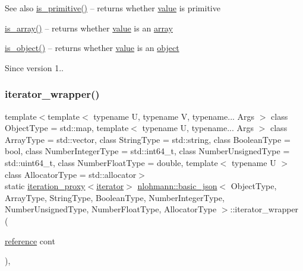 \begin{DoxySeeAlso}{See also}
\hyperlink{classnlohmann_1_1basic__json_adcd6086bac286854d5cc8b7f84d74a49}{is\+\_\+primitive()} -- returns whether \hyperlink{classnlohmann_1_1basic__json_a407e73a037e6e3067ef7aa2c25a79f39}{value} is primitive 

\hyperlink{classnlohmann_1_1basic__json_a256a4cef002023acab3c9d75b569f54a}{is\+\_\+array()} -- returns whether \hyperlink{classnlohmann_1_1basic__json_a407e73a037e6e3067ef7aa2c25a79f39}{value} is an \hyperlink{classnlohmann_1_1basic__json_a5685815624b086caa532f41e853d4b0f}{array} 

\hyperlink{classnlohmann_1_1basic__json_a94ba313c00f1713fa4be85de64083754}{is\+\_\+object()} -- returns whether \hyperlink{classnlohmann_1_1basic__json_a407e73a037e6e3067ef7aa2c25a79f39}{value} is an \hyperlink{classnlohmann_1_1basic__json_ad25b2f8c21e241e2d63455537a9294ff}{object}
\end{DoxySeeAlso}
\begin{DoxySince}{Since}
version 1.. 
\end{DoxySince}
\hypertarget{classnlohmann_1_1basic__json_ab936779c70bec68343ef440ed13251e5}{}\label{classnlohmann_1_1basic__json_ab936779c70bec68343ef440ed13251e5} 
\subsubsection{\texorpdfstring{iterator\+\_\+wrapper()}{iterator\_wrapper()}\hspace{0.1cm}{\footnotesize\ttfamily [1/2]}}
{\footnotesize\ttfamily template$<$template$<$ typename U, typename V, typename... Args $>$ class Object\+Type = std\+::map, template$<$ typename U, typename... Args $>$ class Array\+Type = std\+::vector, class String\+Type  = std\+::string, class Boolean\+Type  = bool, class Number\+Integer\+Type  = std\+::int64\+\_\+t, class Number\+Unsigned\+Type  = std\+::uint64\+\_\+t, class Number\+Float\+Type  = double, template$<$ typename U $>$ class Allocator\+Type = std\+::allocator$>$ \\
static \hyperlink{classnlohmann_1_1basic__json_1_1iteration__proxy}{iteration\+\_\+proxy}$<$\hyperlink{classnlohmann_1_1basic__json_1_1iterator}{iterator}$>$ \hyperlink{classnlohmann_1_1basic__json}{nlohmann\+::basic\+\_\+json}$<$ Object\+Type, Array\+Type, String\+Type, Boolean\+Type, Number\+Integer\+Type, Number\+Unsigned\+Type, Number\+Float\+Type, Allocator\+Type $>$\+::iterator\+\_\+wrapper (\begin{DoxyParamCaption}\item[{\hyperlink{classnlohmann_1_1basic__json_a3ec8e17be8732fe436e9d6733f52b7a3}{reference}}]{cont }\end{DoxyParamCaption})\hspace{0.3cm}{\ttfamily [inline]}, {\ttfamily [static]}}



